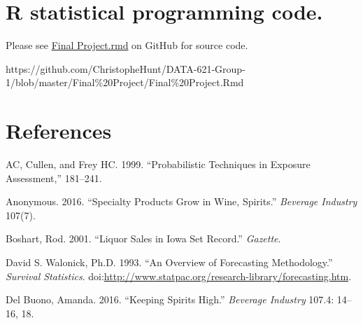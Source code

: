 \documentclass[]{elsarticle} %
\begin{document}
\section{R statistical programming
code.}\label{r-statistical-programming-code.}

Please see
\href{https://github.com/ChristopheHunt/DATA-621-Group-1/blob/master/Final\%20Project/Final\%20Project.Rmd}{Final
Project.rmd} on GitHub for source code.

https://github.com/ChristopheHunt/DATA-621-Group-1/blob/master/Final\%20Project/Final\%20Project.Rmd

\section*{References}\label{references}

\hypertarget{refs}{}
\hypertarget{ref-CullenFrey4}{}
AC, Cullen, and Frey HC. 1999. ``Probabilistic Techniques in Exposure
Assessment,'' 181--241.

\hypertarget{ref-SpecialityGrow3}{}
Anonymous. 2016. ``Specialty Products Grow in Wine, Spirits.''
\emph{Beverage Industry} 107(7).

\hypertarget{ref-IowaSetsRecord2}{}
Boshart, Rod. 2001. ``Liquor Sales in Iowa Set Record.'' \emph{Gazette}.

\hypertarget{ref-Forecast1}{}
David S. Walonick, Ph.D. 1993. ``An Overview of Forecasting
Methodology.'' \emph{Survival Statistics}.
doi:\href{https://doi.org/http://www.statpac.org/research-library/forecasting.htm}{http://www.statpac.org/research-library/forecasting.htm}.

\hypertarget{ref-KeepingSpiritsHigh1}{}
Del Buono, Amanda. 2016. ``Keeping Spirits High.'' \emph{Beverage
Industry} 107.4: 14--16, 18.
\end{document}
